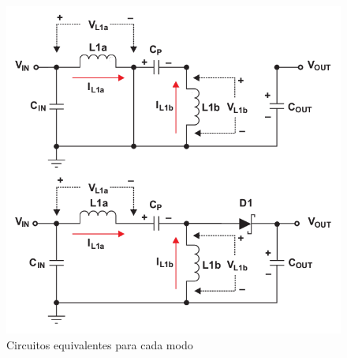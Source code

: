     \begin{figure}[H]
            \centering
          \includegraphics[scale = 0.25]{Figuras/Modos_BB.png}
            \caption{Circuitos equivalentes para cada modo \cite{falin2008designing}}
            \label{fig: Circuito sepic}
      \end{figure}
       
